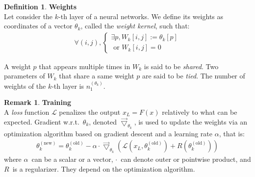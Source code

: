 \documentclass{article}
\theoremstyle{definition}
\newtheorem{definition}{Definition}[section]
\newtheorem{remark}{Remark}
\newcommand{\ovec}{}
\begin{document}
\begin{definition}\textbf{Weights}\\
Let consider the $k$-th layer of a neural networks. We define its weights as coordinates of a vector $\theta_k$, called the \emph{weight kernel}, such that:
\begin{gather*}
  \forall (i,j),
    \begin{cases}
      \exists p, W_k[i,j] := \theta_k[p] \\
      \text{ or } W_k[i,j] = 0
    \end{cases}
\end{gather*}
\end{definition}
A weight $p$ that appears multiple times in $W_k$ is said to be \emph{shared}. Two parameters of $W_k$ that share a same weight $p$ are said to be \emph{tied}. The number of weights of the $k$-th layer is $n_1^{(\theta_k)}$.


\begin{remark}\textbf{Training}\\
A \emph{loss} function $\mathcal{L}$ penalizes the output $x_L = F(\ovec{x})$ relatively to what can be expected. Gradient w.r.t.~$\theta_k$, denoted $\vec{\bigtriangledown}_{\theta_k}$, is used to update the weights via an optimization algorithm based on gradient descent and a learning rate $\alpha$, that is:
\begin{gather}
\theta_k^{(\text{new})} = \theta_k^{(\text{old})} - \alpha \cdot \vec{\bigtriangledown}_{\theta_k} \left( \mathcal{L}\left( x_L, \theta_k^{(\text{old})} \right) + R\left( \theta_k^{(\text{old})} \right) \right)
\end{gather}
where $\alpha$~can be a scalar or a vector, $\cdot$~can denote outer or pointwise product, and $R$~is a regularizer. They depend on the optimization algorithm.
\end{remark}
\end{document}
